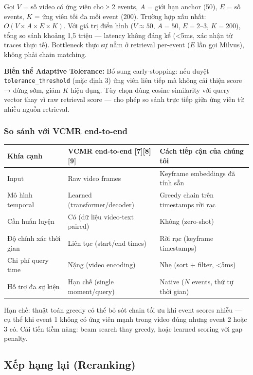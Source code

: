 \documentclass[12pt,a4paper,onecolumn]{article}
\begin{document}
Gọi $V$ = số video có ứng viên cho ≥ 2 events, $A$ = giới hạn anchor (50), $E$ = số events, $K$ = ứng viên tối đa mỗi event (200). Trường hợp xấu nhất: $O(V \times A \times E \times K)$. Với giá trị điển hình ($V \approx 50$, $A = 50$, $E = 2\text{–}3$, $K = 200$), tổng so sánh khoảng 1,5 triệu — latency không đáng kể (<5ms, xác nhận từ traces thực tế). Bottleneck thực sự nằm ở retrieval per-event ($E$ lần gọi Milvus), không phải chain matching.

\textbf{Biến thể Adaptive Tolerance:} Bổ sung early-stopping: nếu duyệt \texttt{tolerance\_threshold} (mặc định 3) ứng viên liên tiếp mà không cải thiện score → dừng sớm, giảm $K$ hiệu dụng. Tùy chọn dùng cosine similarity với query vector thay vì raw retrieval score — cho phép so sánh trực tiếp giữa ứng viên từ nhiều nguồn retrieval.

\subsubsection{So sánh với VCMR end-to-end}

\begin{center}
\begin{tabular}{l l l}
\toprule
Khía cạnh & VCMR end-to-end [7][8][9] & Cách tiếp cận của chúng tôi \\
\midrule
Input & Raw video frames & Keyframe embeddings đã tính sẵn \\
Mô hình temporal & Learned (transformer/decoder) & Greedy chain trên timestamps rời rạc \\
Cần huấn luyện & Có (dữ liệu video-text paired) & Không (zero-shot) \\
Độ chính xác thời gian & Liên tục (start/end times) & Rời rạc (keyframe timestamps) \\
Chi phí query time & Nặng (video encoding) & Nhẹ (sort + filter, <5ms) \\
Hỗ trợ đa sự kiện & Hạn chế (single moment/query) & Native ($N$ events, thứ tự thời gian) \\
\bottomrule
\end{tabular}
\end{center}


Hạn chế: thuật toán greedy có thể bỏ sót chain tối ưu khi event scores nhiễu — cụ thể khi event 1 không có ứng viên mạnh trong video đúng nhưng event 2 hoặc 3 có. Cải tiến tiềm năng: beam search thay greedy, hoặc learned scoring với gap penalty.

\subsection{Xếp hạng lại (Reranking)}
\end{document}
